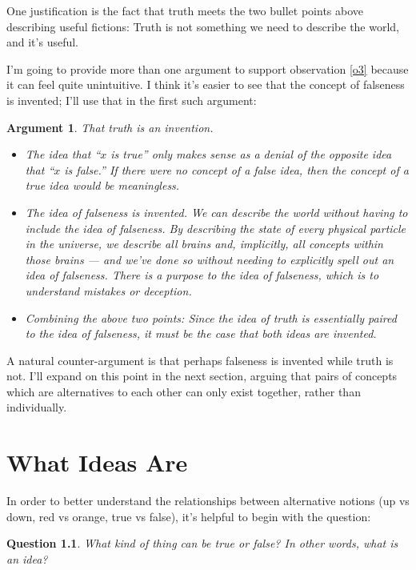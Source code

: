 \documentclass[9pt, twoside]{book}
\newtheorem*{question*}{Question}
\theoremstyle{argtstyle}
\newtheorem*{argt}{Argument}
\begin{document}
One justification is the fact that truth meets the two bullet points
above describing useful fictions:
Truth is not something we need to describe the world, and it's useful.

I'm going to provide more than one argument to support observation \ref{o3}
because it can feel quite unintuitive.
I think it's easier to see that the concept
of falseness is invented; I'll use that
in the first such argument:
\begin{argt} That truth is an invention.
    \label{a2}
    \normalfont
    \begin{itemize}
        \item
            The idea that ``$x$ is true'' only makes sense as a denial of the
            opposite idea that ``$x$ is false.'' If there were no concept of a
            false idea, then the concept of a true idea would be meaningless.
        \item
            The idea of falseness is invented. We can describe
            the world without having to include the idea of falseness.
            By describing the state of every physical particle in the universe,
            we describe all brains and, implicitly, all concepts
            within those brains --- and we've done so without
            needing to explicitly spell out an idea of falseness.
            There is a purpose to the idea of falseness, which is to understand
            mistakes or deception.
        \item
            Combining the above two points:
            Since the idea of truth is essentially paired to the idea of
            falseness,
            it must be the case that both ideas are invented.
    \end{itemize}
\end{argt}

A natural counter-argument is that perhaps falseness is invented while truth is
not.
I'll expand on this point in the next section,
arguing that pairs of concepts which are alternatives to
each other can only exist together,
rather than individually.

\chapter{What Ideas Are}

In order to better understand the relationships between alternative
notions (up vs down, red vs orange, true vs false), it's
helpful to begin with the question:
\begin{question*}
    What kind of thing can be true or false?
    In other words, what is an idea?
\end{question*}
\end{document}
